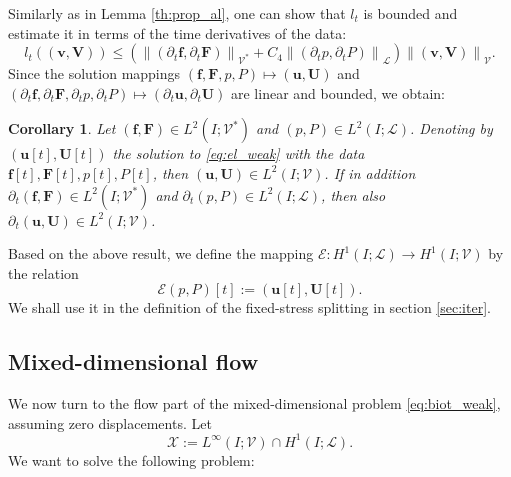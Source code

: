\documentclass[a4paper]{article}
\newtheorem{corollary}[theorem]{Corollary}
\numberwithin{equation}{section}
\def\dt{\prtl_t}
\def\FF{\vc F}
\def\ff{\vc f}
\def\Hf{\mathscr{L}} %
\def\norm#1{\left\|#1\right\|}
\def\prtl{\partial}
\def\U{\vc U}
\def\uu{\vc u}
\def\V{\vc V}
\def\Vel{{\boldsymbol{\mathcal V}}} %
\def\Vf{{\mathcal V}} %
\def\vc#1{\mathbf{#1}}     %
\def\vv{\vc v}
\newcommand{\eqs}[1]{\begin{equation*}#1\end{equation*}}
\begin{document}
Similarly as in Lemma \ref{th:prop_al}, one can show that $l_t$ is bounded and estimate it in terms of the time derivatives of the data:
\eqs{ l_t((\vv,\V)) \le \left(\norm{(\dt\ff,\dt\FF)}_{\Vel^*} + C_4\norm{(\dt p,\dt P)}_\Hf\right)\norm{(\vv,\V)}_\Vel. }
Since the solution mappings $(\ff,\FF,p,P) \mapsto (\uu, \U)$ and $(\dt\ff,\dt\FF,\dt p,\dt P)\mapsto(\dt\uu,\dt\U)$ are linear and bounded, we obtain:
\begin{corollary}
Let $(\ff,\FF)\in L^2( I;\Vel^*)$ and $(p,P)\in L^2( I;\Hf)$.
Denoting by $(\uu[t],\U[t])$ the solution to \eqref{eq:el_weak} with the data $\ff[t],\FF[t],p[t],P[t]$, then $(\uu,\U)\in L^2( I;\Vel)$.
If in addition $\dt(\ff,\FF)\in L^2( I;\Vel^*)$ and $\dt(p,P)\in L^2( I;\Hf)$, then also $\dt(\uu,\U)\in L^2( I;\Vel)$.
\end{corollary}
% 
Based on the above result, we define the mapping $\mathcal E: H^1( I;\Hf)\to H^1( I;\Vel)$ by the relation
\eqs{ \mathcal E(p,P)[t] := (\uu[t],\U[t]). }
We shall use it in the definition of the fixed-stress splitting in section \ref{sec:iter}.


\subsection{Mixed-dimensional flow}\label{sec:wellposedness_flow}

We now turn to the flow part of the mixed-dimensional problem \eqref{eq:biot_weak}, assuming zero displacements.
Let
\eqs{ \mathcal X := L^\infty( I;\Vf)\cap H^1( I;\Hf). }
We want to solve the following problem:
\end{document}
